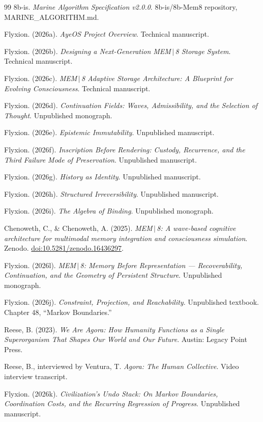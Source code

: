 \documentclass[11pt]{article}
\begin{document}
\begin{thebibliography}{99}
8b-is. \emph{Marine Algorithm Specification v2.0.0}. 8b-is/8b-Mem8 repository, MARINE\_ALGORITHM.md.

Flyxion. (2026a). \emph{AyeOS Project Overview}. Technical manuscript.

Flyxion. (2026b). \emph{Designing a Next-Generation MEM\,$|$\,8 Storage System}. Technical manuscript.

Flyxion. (2026c). \emph{MEM\,$|$\,8 Adaptive Storage Architecture: A Blueprint for Evolving Consciousness}. Technical manuscript.

Flyxion. (2026d). \emph{Continuation Fields: Waves, Admissibility, and the Selection of Thought}. Unpublished monograph.

Flyxion. (2026e). \emph{Epistemic Immutability}. Unpublished manuscript.

Flyxion. (2026f). \emph{Inscription Before Rendering: Custody, Recurrence, and the Third Failure Mode of Preservation}. Unpublished manuscript.

Flyxion. (2026g). \emph{History as Identity}. Unpublished manuscript.

Flyxion. (2026h). \emph{Structured Irreversibility}. Unpublished manuscript.

Flyxion. (2026i). \emph{The Algebra of Binding}. Unpublished monograph.

Chenoweth, C., \& Chenoweth, A. (2025). \emph{MEM\,$|$\,8: A wave-based cognitive architecture for multimodal memory integration and consciousness simulation}. Zenodo. \href{https://doi.org/10.5281/zenodo.16436297}{doi:10.5281/zenodo.16436297}.

Flyxion. (2026l). \emph{MEM\,$|$\,8: Memory Before Representation --- Recoverability, Continuation, and the Geometry of Persistent Structure}. Unpublished monograph.

Flyxion. (2026j). \emph{Constraint, Projection, and Reachability}. Unpublished textbook. Chapter 48, ``Markov Boundaries.''

Reese, B. (2023). \emph{We Are Agora: How Humanity Functions as a Single Superorganism That Shapes Our World and Our Future}. Austin: Legacy Point Press.

Reese, B., interviewed by Ventura, T. \emph{Agora: The Human Collective}. Video interview transcript.

Flyxion. (2026k). \emph{Civilization's Undo Stack: On Markov Boundaries, Coordination Costs, and the Recurring Regression of Progress}. Unpublished manuscript.

\end{thebibliography}
\end{document}
